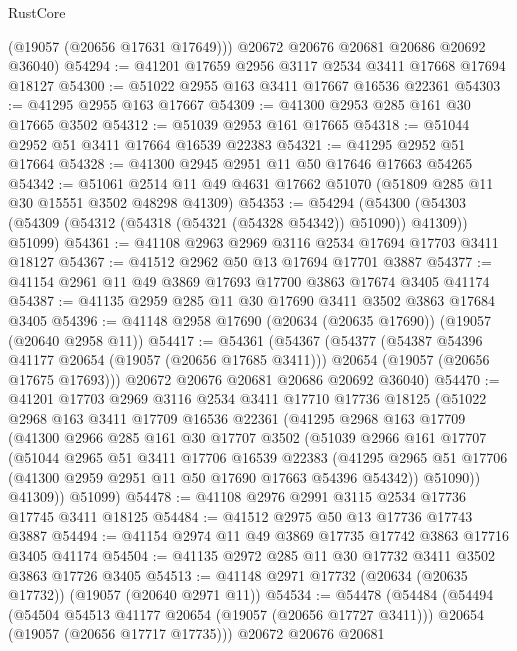 \begin{lexlean}{RustCore}
\begin{coremodule}
        (@19057 (@20656 @17631 @17649)))
      @20672
      @20676
      @20681
      @20686
      @20692
      @36040)
@54294 := @41201 @17659 @2956 @3117 @2534 @3411 @17668 @17694 @18127
@54300 := @51022 @2955 @163 @3411 @17667 @16536 @22361
@54303 := @41295 @2955 @163 @17667
@54309 := @41300 @2953 @285 @161 @30 @17665 @3502
@54312 := @51039 @2953 @161 @17665
@54318 := @51044 @2952 @51 @3411 @17664 @16539 @22383
@54321 := @41295 @2952 @51 @17664
@54328 := @41300 @2945 @2951 @11 @50 @17646 @17663 @54265
@54342 := @51061 @2514 @11 @49 @4631 @17662 @51070 (@51809 @285 @11 @30 @15551 @3502 @48298 @41309)
@54353 := @54294
    (@54300 (@54303 (@54309 (@54312 (@54318 (@54321 (@54328 @54342)) @51090)) @41309)) @51099)
@54361 := @41108 @2963 @2969 @3116 @2534 @17694 @17703 @3411 @18127
@54367 := @41512 @2962 @50 @13 @17694 @17701 @3887
@54377 := @41154 @2961 @11 @49 @3869 @17693 @17700 @3863 @17674 @3405 @41174
@54387 := @41135 @2959 @285 @11 @30 @17690 @3411 @3502 @3863 @17684 @3405
@54396 := @41148 @2958 @17690 (@20634 (@20635 @17690)) (@19057 (@20640 @2958 @11))
@54417 := @54361
    (@54367
      (@54377
        (@54387 @54396 @41177 @20654 (@19057 (@20656 @17685 @3411)))
        @20654
        (@19057 (@20656 @17675 @17693)))
      @20672
      @20676
      @20681
      @20686
      @20692
      @36040)
@54470 := @41201
    @17703
    @2969
    @3116
    @2534
    @3411
    @17710
    @17736
    @18125
    (@51022
      @2968
      @163
      @3411
      @17709
      @16536
      @22361
      (@41295
        @2968
        @163
        @17709
        (@41300
          @2966
          @285
          @161
          @30
          @17707
          @3502
          (@51039
            @2966
            @161
            @17707
            (@51044
              @2965
              @51
              @3411
              @17706
              @16539
              @22383
              (@41295 @2965 @51 @17706 (@41300 @2959 @2951 @11 @50 @17690 @17663 @54396 @54342))
              @51090))
          @41309))
      @51099)
@54478 := @41108 @2976 @2991 @3115 @2534 @17736 @17745 @3411 @18125
@54484 := @41512 @2975 @50 @13 @17736 @17743 @3887
@54494 := @41154 @2974 @11 @49 @3869 @17735 @17742 @3863 @17716 @3405 @41174
@54504 := @41135 @2972 @285 @11 @30 @17732 @3411 @3502 @3863 @17726 @3405
@54513 := @41148 @2971 @17732 (@20634 (@20635 @17732)) (@19057 (@20640 @2971 @11))
@54534 := @54478
    (@54484
      (@54494
        (@54504 @54513 @41177 @20654 (@19057 (@20656 @17727 @3411)))
        @20654
        (@19057 (@20656 @17717 @17735)))
      @20672
      @20676
      @20681

\end{coremodule}
\end{lexlean}
